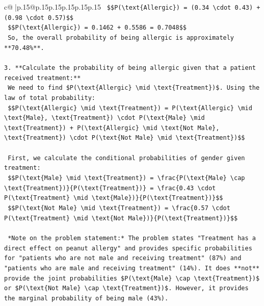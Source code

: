\documentclass{article}
\begin{document}
{\begin{supertabular}{c@{$\;$}|p{.15\linewidth}@{}p{.15\linewidth}p{.15\linewidth}p{.15\linewidth}p{.15\linewidth}p{.15\linewidth}}
{{{\texttt{    \$\$P(\textbackslash{}text\{Allergic\}) = (0.34 \textbackslash{}cdot 0.43) + (0.98 \textbackslash{}cdot 0.57)\$\$} \\
\texttt{    \$\$P(\textbackslash{}text\{Allergic\}) = 0.1462 + 0.5586 = 0.7048\$\$} \\
\texttt{    So, the overall probability of being allergic is approximately **70.48\%**.} \\
\\ 
\texttt{3.  **Calculate the probability of being allergic given that a patient received treatment:**} \\
\texttt{    We need to find \$P(\textbackslash{}text\{Allergic\} \textbackslash{}mid \textbackslash{}text\{Treatment\})\$. Using the law of total probability:} \\
\texttt{    \$\$P(\textbackslash{}text\{Allergic\} \textbackslash{}mid \textbackslash{}text\{Treatment\}) = P(\textbackslash{}text\{Allergic\} \textbackslash{}mid \textbackslash{}text\{Male\}, \textbackslash{}text\{Treatment\}) \textbackslash{}cdot P(\textbackslash{}text\{Male\} \textbackslash{}mid \textbackslash{}text\{Treatment\}) + P(\textbackslash{}text\{Allergic\} \textbackslash{}mid \textbackslash{}text\{Not Male\}, \textbackslash{}text\{Treatment\}) \textbackslash{}cdot P(\textbackslash{}text\{Not Male\} \textbackslash{}mid \textbackslash{}text\{Treatment\})\$\$} \\
\\ 
\texttt{    First, we calculate the conditional probabilities of gender given treatment:} \\
\texttt{    \$\$P(\textbackslash{}text\{Male\} \textbackslash{}mid \textbackslash{}text\{Treatment\}) = \textbackslash{}frac\{P(\textbackslash{}text\{Male\} \textbackslash{}cap \textbackslash{}text\{Treatment\})\}\{P(\textbackslash{}text\{Treatment\})\} = \textbackslash{}frac\{0.43 \textbackslash{}cdot P(\textbackslash{}text\{Treatment\} \textbackslash{}mid \textbackslash{}text\{Male\})\}\{P(\textbackslash{}text\{Treatment\})\}\$\$} \\
\texttt{    \$\$P(\textbackslash{}text\{Not Male\} \textbackslash{}mid \textbackslash{}text\{Treatment\}) = \textbackslash{}frac\{0.57 \textbackslash{}cdot P(\textbackslash{}text\{Treatment\} \textbackslash{}mid \textbackslash{}text\{Not Male\})\}\{P(\textbackslash{}text\{Treatment\})\}\$\$} \\
\\ 
\texttt{    *Note on the problem statement:* The problem states "Treatment has a direct effect on peanut allergy" and provides specific probabilities for "patients who are not male and receiving treatment" (87\%) and "patients who are male and receiving treatment" (14\%). It does **not** provide the joint probabilities \$P(\textbackslash{}text\{Male\} \textbackslash{}cap \textbackslash{}text\{Treatment\})\$ or \$P(\textbackslash{}text\{Not Male\} \textbackslash{}cap \textbackslash{}text\{Treatment\})\$. However, it provides the marginal probability of being male (43\%).} \\
}}}
\end{supertabular}}
\end{document}
